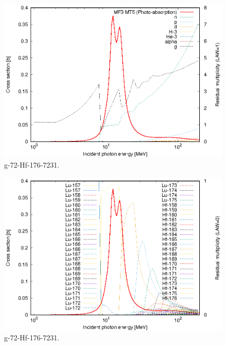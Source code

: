 \begin{figure}
 \includegraphics[width=\linewidth]{eps/g_72-Hf-176_7231.eps}
  \caption{g-72-Hf-176-7231.}
\end{figure}
\begin{figure}
 \includegraphics[width=\linewidth]{eps-law0/g_72-Hf-176_7231.eps}
 \caption{g-72-Hf-176-7231.}
\end{figure}
\newpage \clearpage

